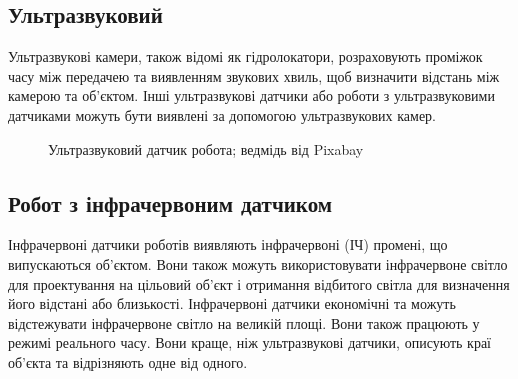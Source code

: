 \documentclass[a4paper,14pt]{extreport}
\begin{document}
\subsection{Ультразвуковий}
Ультразвукові камери, також відомі як гідролокатори, розраховують проміжок часу між передачею та виявленням звукових хвиль, щоб визначити відстань між камерою та об'єктом. Інші ультразвукові датчики або роботи з ультразвуковими датчиками можуть бути виявлені за допомогою ультразвукових камер.
\begin{figure}[h!]
   \caption{ Ультразвуковий датчик робота;   ведмідь від Pixabay}
 \end{figure}


\subsection{Робот з інфрачервоним датчиком}
Інфрачервоні датчики роботів виявляють інфрачервоні (ІЧ) промені, що випускаються об'єктом. Вони також можуть використовувати інфрачервоне світло для проектування на цільовий об'єкт і отримання відбитого світла для визначення його відстані або близькості. Інфрачервоні датчики економічні та можуть відстежувати інфрачервоне світло на великій площі. Вони також працюють у режимі реального часу. Вони краще, ніж ультразвукові датчики, описують краї об'єкта та відрізняють одне від одного.
\end{document}

